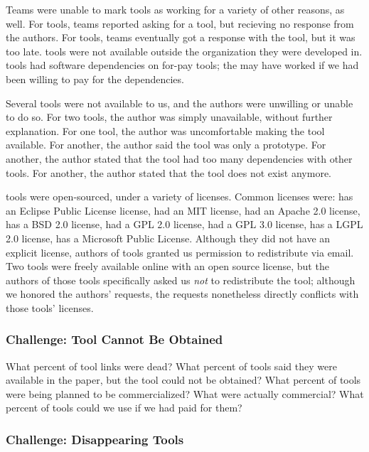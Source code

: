 \documentclass{sig-alternate-05-2015}
\begin{document}
Teams were unable to mark tools as working 
for a variety of other reasons, as well.
For \unworkNoResponseToAsk tools, teams reported asking for a tool,
but recieving no response from the authors.
For \unworkTooLate tools, teams eventually got a response with the tool, 
but it was  too late.
\unworkInternal tools were not available outside the organization
they were developed in.
\unworkPay tools had software dependencies on for-pay tools; 
the may have worked if we had been willing to pay 
for the dependencies.

Several tools were not available to us, 
and the authors were unwilling or unable to do so.
For two tools, the author was simply unavailable,
without further explanation.
For one tool, the author was uncomfortable making 
the tool available.
For another, the author said the tool was only a prototype.
For another, the author stated that the tool had too
many dependencies with other tools.
For another, the author stated that the tool does not
exist anymore.

\redistPermissionArtifact tools were open-sourced, 
under a variety of licenses.
Common licenses were:
\licenseEPL has an Eclipse Public License license,
\licenseMIT had an MIT license,
 had an Apache 2.0 license,
 has a BSD 2.0 license,
 had a GPL 2.0 license,
 had a GPL 3.0 license,
 has a LGPL 2.0 license,
\licenseMPL has a Microsoft Public License.
Although they did not have an explicit license,
authors of \redistPermissionEmail tools granted us
permission to redistribute via email.
Two tools were freely available online
with an open source license, but the authors of those
tools specifically asked us \emph{not} to redistribute the
tool; although we honored the authors' requests,
the requests nonetheless directly conflicts
with those tools' licenses.  

\subsubsection{Challenge: Tool Cannot Be Obtained}

What percent of tool links were dead?
What percent of tools said they were available in the paper, but the tool could not be obtained?
What percent of tools were being planned to be commercialized? What were actually commercial?
What percent of tools could we use if we had paid for them?

\subsubsection{Challenge: Disappearing Tools}
\end{document}
